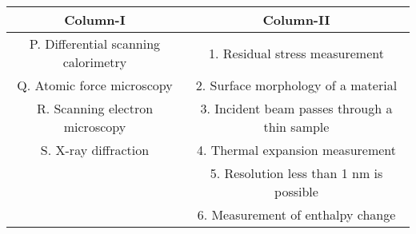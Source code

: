 \begin{tabular}{|c|c|} 
        \hline
        \textbf{Column-I} & \textbf{Column-II} \\
        \hline
         P. Differential scanning calorimetry & 1. Residual stress measurement\\
        \hline
        Q. Atomic force microscopy & 2. Surface morphology of a material \\
        \hline
        R. Scanning electron microscopy & 3. Incident beam passes through a thin sample \\
        \hline
        S. X-ray diffraction & 4. Thermal expansion measurement \\
        \hline
         & 5. Resolution less than 1 nm is possible \\
        \hline
          & 6. Measurement of enthalpy change \\
        \hline
    \end{tabular}